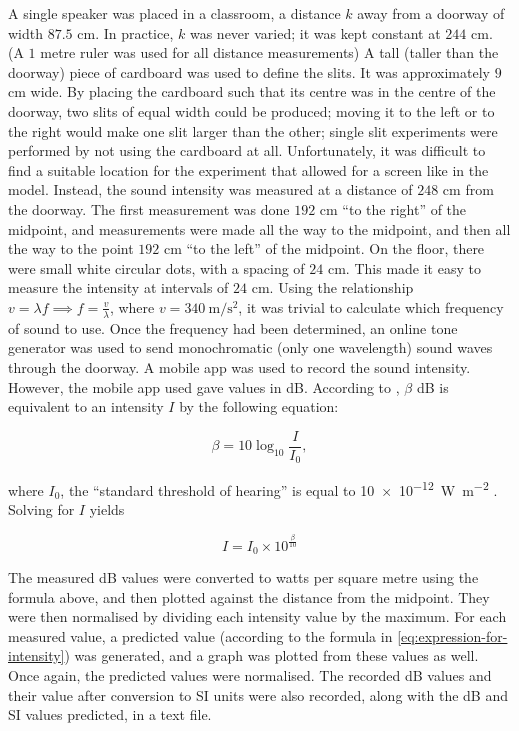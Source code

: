 \documentclass{paper}
\begin{document}
A single speaker was placed in a classroom, a distance $k$ away from a doorway of width $87.5$ cm.
In practice, $k$ was never varied; it was kept constant at $244$ cm. (A $1$ metre ruler was used for all distance measurements) A tall (taller than the doorway) piece of cardboard was used to define the slits. It was approximately $9$ cm wide. By placing the
cardboard such that its centre was in the centre of the doorway, two slits of equal width could be
produced; moving it to the left or to the right would make one slit larger than the other;
single slit experiments were performed by not using the cardboard at all. Unfortunately, it was difficult
to find a suitable location for the experiment that allowed for a screen like in the model. Instead, the
sound intensity was measured at a distance of $248$ cm from the doorway. The first measurement was done
$192$ cm \enquote{to the right} of the midpoint, and measurements were made all the way to the midpoint,
and then all the way to the point $192$ cm \enquote{to the left} of the midpoint. On the floor, there were
small white circular dots, with a spacing of $24$ cm. This made it easy to measure the intensity at intervals
of $24$ cm. Using the relationship $v = \lambda{}f \implies f = \frac{v}{\lambda}$, where $v = \SI{340}{\m\per\square\s}$, 
it was trivial to calculate which frequency of sound to use. Once the frequency had been determined,
an online tone generator \parencite{tone-generator} was used to send monochromatic
(only one wavelength) sound waves through the doorway. A mobile app \parencite{sound-meter} was used to record the sound
intensity. However, the mobile app used gave values in dB. According to \parencite{decibel-to-intensity}, $\beta$ dB
is equivalent to an intensity $I$ by the following equation:

\begin{equation*}
    \beta = 10\log_{10}\frac{I}{I_0},
\end{equation*}
                
where $I_0$, the \enquote{standard threshold of hearing} is equal to \SI{10e-12}{\watt\per\square\m} \parencite{decibel-to-intensity}.
Solving for $I$ yields

\begin{equation*}
    I = I_{0} \times 10^{\frac{\beta}{10}}
\end{equation*}

The measured dB values were converted to watts per square metre using the formula above,
and then plotted against the distance from the midpoint. They were then normalised by dividing each
intensity value by the maximum. For each measured value, a predicted value (according to the formula in 
\eqref{eq:expression-for-intensity}) was generated, and a graph was plotted from these values as well.
Once again, the predicted values were normalised. The recorded dB values and their value after conversion to
SI units were also recorded, along with the dB and SI values predicted, in a text file.
\end{document}
